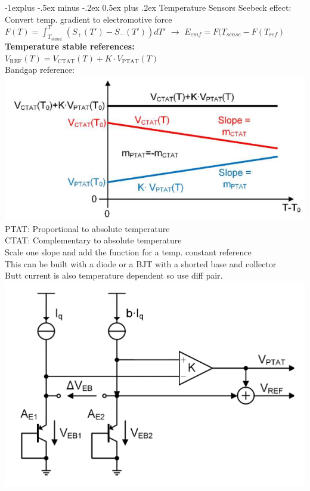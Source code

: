 \documentclass[5pt,landscape]{article}
\makeatletter
\renewcommand{\subsection}{\@startsection{subsection}{2}{0mm}%
                                {-1explus -.5ex minus -.2ex}%
                                {0.5ex plus .2ex}%
                                {\normalfont\normalsize\bfseries}}
\makeatother
\begin{document}
\begin{multicols*}{5}
\subsection{Temperature Sensors}
Seebeck effect: Convert temp. gradient to electromotive force
$ F(T)  \hat{=} \int_{T_{stand.}}^{T} (S_{+} (T') - S_- (T')) dT'   $ $ \rightarrow $ $ E_{emf} = F(T_{sense} - F(T_{ref})$
\textbf{Temperature stable references:}\\
$ V_{\mathrm{REF}}(T)=V_{\mathrm{CTAT}}(T)+K \cdot V_{\mathrm{PTAT}}(T) $\\
Bandgap reference:
\includegraphics[width=\columnwidth]{images/bandgapreference.png}
PTAT: Proportional to absolute temperature\\
CTAT: Complementary to absolute temperature\\
Scale one slope and add the function for a temp. constant reference\\
This can be built with a diode or a BJT with a shorted base and collector\\
Butt current is also temperature dependent so use diff pair.
\includegraphics[width=\columnwidth]{images/gen_ptat_ctat.png}

\end{multicols*}
\end{document}
